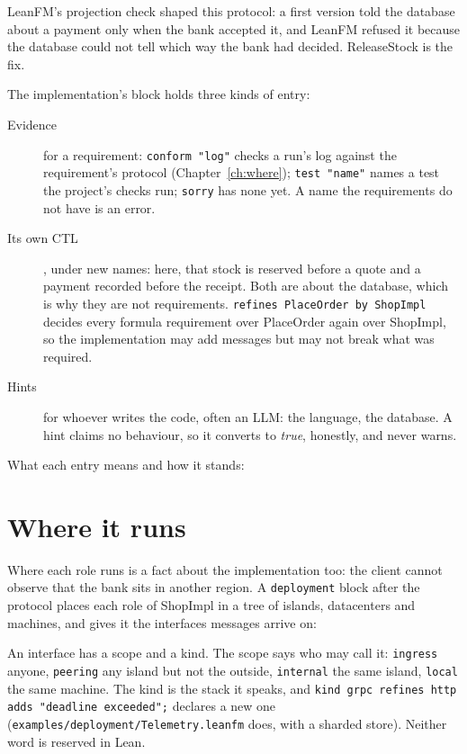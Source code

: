 LeanFM's projection check shaped this protocol: a first version told the database about
a payment only when the bank accepted it, and LeanFM refused it because the database could
not tell which way the bank had decided. ReleaseStock is the fix.

The implementation's block holds three kinds of entry:



\begin{description}
\item[Evidence] for a requirement: \texttt{conform "log"} checks a run's log against the
requirement's protocol (Chapter~\ref{ch:where}); \texttt{test "name"} names a test the
project's checks run; \texttt{sorry} has none yet. A name the requirements do not have is
an error.
\item[Its own CTL], under new names: here, that stock is reserved before a quote and a
payment recorded before the receipt. Both are about the database, which is why they are
not requirements. \texttt{refines PlaceOrder by ShopImpl} decides every formula requirement
over PlaceOrder again over ShopImpl, so the implementation may add messages but may not
break what was required.
\item[Hints] for whoever writes the code, often an LLM: the language, the database. A
hint claims no behaviour, so it converts to \emph{true}, honestly, and never warns.
\end{description}

What each entry means and how it stands:


\section{Where it runs}
\label{sec:deployment}

Where each role runs is a fact about the implementation too: the client cannot observe that the
bank sits in another region. A \texttt{deployment} block after the protocol places each role of
ShopImpl in a tree of islands, datacenters and machines, and gives it the interfaces messages
arrive on:



An interface has a scope and a kind. The scope says who may call it: \texttt{ingress} anyone,
\texttt{peering} any island but not the outside, \texttt{internal} the same island,
\texttt{local} the same machine. The kind is the stack it speaks, and
\texttt{kind grpc refines http adds "deadline exceeded";} declares a new one
(\texttt{examples/deployment/Telemetry.leanfm} does, with a sharded store). Neither word is
reserved in Lean.

